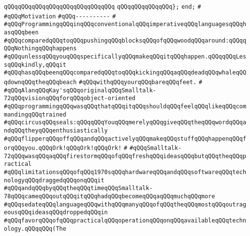 \verb|qQQqqQQqqQQqqQQqqQQqqQQqqQQqqQQq|\newline
\verb|qQQqqQQqqQQqqQQq};|\newline
\verb|end;|\newline
\newline
\verb|#|\newline
\verb|#qQQqMotivation|\newline
\verb|#qQQq----------|\newline
\verb|#|\newline
\verb|#qQQqProgrammingqQQqinqQQqconventionalqQQqimperativeqQQqlanguagesqQQqhasqQQqbeen|\newline
\verb|#qQQqcomparedqQQqtoqQQqpushingqQQqblocksqQQqofqQQqwoodqQQqaround:qQQqqQQqNothingqQQqhappens|\newline
\verb|#qQQqunlessqQQqyouqQQqspecificallyqQQqmakeqQQqitqQQqhappen.qQQqqQQqLessqQQqkindly,qQQqit|\newline
\verb|#qQQqhasqQQqbeenqQQqcomparedqQQqtoqQQqkickingqQQqaqQQqdeadqQQqwhaleqQQqdownqQQqtheqQQqbeach|\newline
\verb|#qQQqwithqQQqyourqQQqbareqQQqfeet.|\newline
\verb|#|\newline
\verb|#qQQqAlanqQQqKay'sqQQqoriginalqQQqSmalltalk-72qQQqvisionqQQqforqQQqobject-oriented|\newline
\verb|#qQQqprogrammingqQQqwasqQQqthatqQQqitqQQqshouldqQQqfeelqQQqlikeqQQqcommandingqQQqtrained|\newline
\verb|#qQQqcircusqQQqseals:qQQqqQQqYouqQQqmerelyqQQqgiveqQQqtheqQQqwordqQQqandqQQqtheyqQQqenthusiastically|\newline
\verb|#qQQqflipperqQQqoffqQQqandqQQqactivelyqQQqmakeqQQqstuffqQQqhappenqQQqforqQQqyou.qQQqOrk!qQQqOrk!qQQqOrk!|\newline
\verb|#|\newline
\verb|#qQQqSmalltalk-72qQQqwasqQQqaqQQqfirestormqQQqofqQQqfreshqQQqideasqQQqbutqQQqtheqQQqpractical|\newline
\verb|#qQQqlimitationsqQQqofqQQq1970sqQQqhardwareqQQqandqQQqsoftwareqQQqtechnologyqQQqdraggedqQQqonqQQqit|\newline
\verb|#qQQqandqQQqbyqQQqtheqQQqtimeqQQqSmalltalk-78qQQqcameqQQqoutqQQqitqQQqhadqQQqbecomeqQQqaqQQqmuchqQQqmore|\newline
\verb|#qQQqsedateqQQqlanguageqQQqwithqQQqmanyqQQqofqQQqtheqQQqmostqQQqoutrageousqQQqideasqQQqdroppedqQQqin|\newline
\verb|#qQQqfavorqQQqofqQQqpracticalqQQqoperationqQQqonqQQqavailableqQQqtechnology.qQQqqQQq(The|\newline
